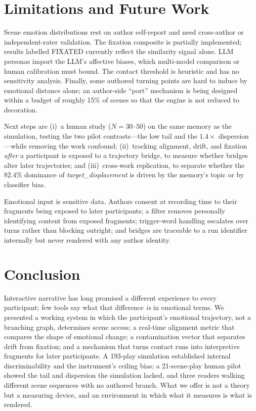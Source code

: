 \documentclass[runningheads]{llncs}
\begin{document}
\section{Limitations and Future Work}

Scene emotion distributions rest on author self-report and need cross-author or independent-rater validation. The fixation composite is partially implemented; results labelled FIXATED currently reflect the similarity signal alone. LLM personas import the LLM's affective biases, which multi-model comparison or human calibration must bound. The contact threshold is heuristic and has no sensitivity analysis. Finally, some authored turning points are hard to induce by emotional distance alone; an author-side ``port'' mechanism is being designed within a budget of roughly 15\% of scenes so that the engine is not reduced to decoration.

Next steps are (i)~a human study ($N = 30$--$50$) on the same memory as the simulation, testing the two pilot contrasts---the low tail and the $1.4\times$ dispersion---while removing the work confound; (ii)~tracking alignment, drift, and fixation \emph{after} a participant is exposed to a trajectory bridge, to measure whether bridges alter later trajectories; and (iii)~cross-work replication, to separate whether the $82.4\%$ dominance of \emph{target\_displacement} is driven by the memory's topic or by classifier bias.

Emotional input is sensitive data. Authors consent at recording time to their fragments being exposed to later participants; a filter removes personally identifying content from exposed fragments; trigger-word handling escalates over turns rather than blocking outright; and bridges are traceable to a run identifier internally but never rendered with any author identity.

\section{Conclusion}

Interactive narrative has long promised a different experience to every participant; few tools say what that difference \emph{is} in emotional terms. We presented a working system in which the participant's emotional trajectory, not a branching graph, determines scene access; a real-time alignment metric that compares the shape of emotional change; a contamination vector that separates drift from fixation; and a mechanism that turns contact runs into interpretive fragments for later participants. A 193-play simulation established internal discriminability and the instrument's ceiling bias; a 21-scene-play human pilot showed the tail and dispersion the simulation lacked, and three readers walking different scene sequences with no authored branch. What we offer is not a theory but a measuring device, and an environment in which what it measures is what is rendered.



\end{document}
